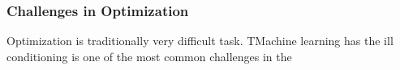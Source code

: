 \subsubsection{Challenges in Optimization}

Optimization is traditionally very difficult task. TMachine learning has 
the ill conditioning is one of the most common challenges in the 